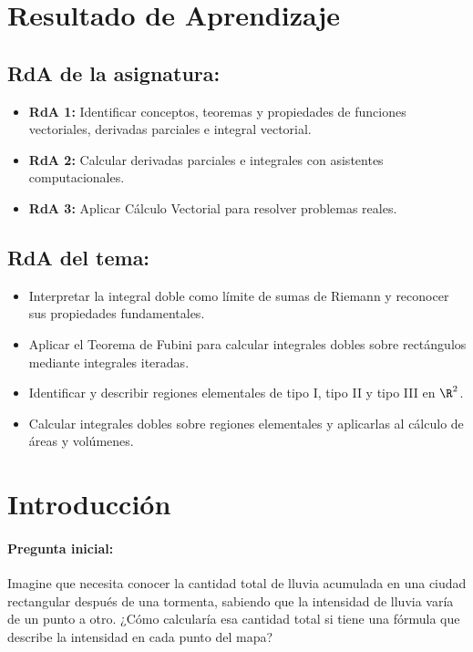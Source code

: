 \documentclass[a4,11pt]{aleph-notas}
\begin{document}
\encabezado

\section*{Resultado de Aprendizaje}

\subsection*{RdA de la asignatura:}
\begin{itemize}[leftmargin=*]
    \item \textbf{RdA 1:} Identificar conceptos, teoremas y propiedades de funciones vectoriales, derivadas parciales e integral vectorial.
    \item \textbf{RdA 2:} Calcular derivadas parciales e integrales con asistentes computacionales.
    \item \textbf{RdA 3:} Aplicar Cálculo Vectorial para resolver problemas reales.
\end{itemize}

\subsection*{RdA del tema:}
\begin{itemize}[leftmargin=*]
    \item Interpretar la integral doble como límite de sumas de Riemann y reconocer sus propiedades fundamentales.
    \item Aplicar el Teorema de Fubini para calcular integrales dobles sobre rectángulos mediante integrales iteradas.
    \item Identificar y describir regiones elementales de tipo I, tipo II y tipo III en $\R^2$.
    \item Calcular integrales dobles sobre regiones elementales y aplicarlas al cálculo de áreas y volúmenes.
\end{itemize}

\section*{Introducción}

\paragraph{Pregunta inicial:}
Imagine que necesita conocer la cantidad total de lluvia acumulada en una ciudad rectangular después de una tormenta, sabiendo que la intensidad de lluvia varía de un punto a otro. ¿Cómo calcularía esa cantidad total si tiene una fórmula que describe la intensidad en cada punto del mapa?
\end{document}
